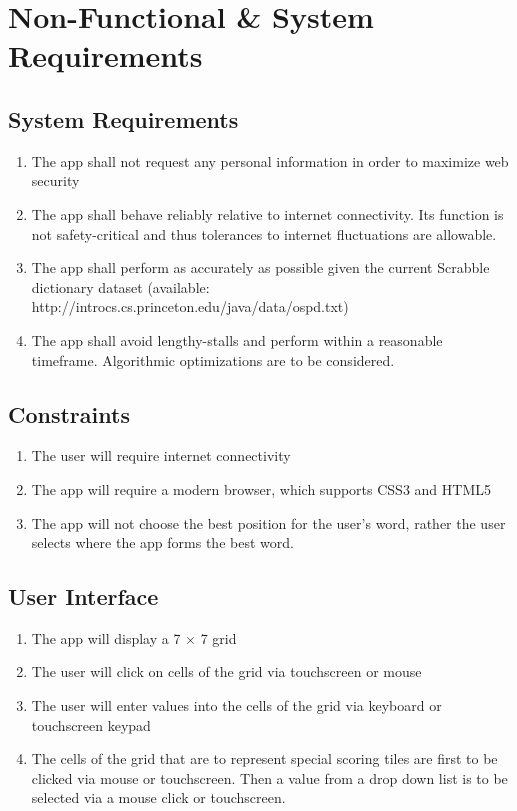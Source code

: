\documentclass[12pt, oneside]{article}
\begin{document}

\section{Non-Functional \& System Requirements}
\subsection{System Requirements}
\begin{enumerate}[1.] 
	\item The app shall not request any personal information in order to maximize web security
	\item The app shall behave reliably relative to internet connectivity.  Its function is not safety-critical 		and thus tolerances to internet fluctuations are allowable.
	\item The app shall perform as accurately as possible given the current Scrabble dictionary dataset (available: http://introcs.cs.princeton.edu/java/data/ospd.txt)
	\item The app shall avoid lengthy-stalls and perform within a reasonable timeframe.  Algorithmic 		optimizations are to be considered.
\end{enumerate}

\subsection{Constraints}
\begin{enumerate}[1.]
	\item The user will require internet connectivity
	\item The app will require a modern browser, which supports CSS3 and HTML5
	\item The app will not choose the best position for the user's word, rather the user selects where 		the app forms the best word.	
\end{enumerate}


\subsection{User Interface}
\begin{enumerate}[1.]
	\item The app will display a 7 $\times$ 7 grid
	\item The user will click on cells of the grid via touchscreen or mouse
	\item The user will enter values into the cells of the grid via keyboard or touchscreen keypad
	\item The cells of the grid that are to represent special scoring tiles are first to be clicked via 			mouse or touchscreen.  Then a value from a drop down list is to be selected via a mouse 			click or touchscreen.
\end{enumerate}
\end{document}
